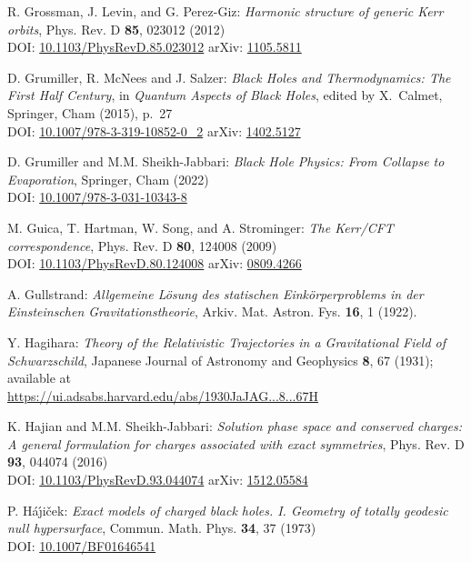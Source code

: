 \begin{thebibliography}{123}
R. Grossman, J. Levin, and G. Perez-Giz:
{\em Harmonic structure of generic Kerr orbits},
Phys. Rev. D {\bf 85}, 023012 (2012)\\
DOI: \href{https://doi.org/10.1103/PhysRevD.85.023012}{10.1103/PhysRevD.85.023012}\hfill
arXiv: \href{https://arxiv.org/abs/1105.5811}{1105.5811}

D. Grumiller, R. McNees and J. Salzer:
{\em Black Holes and Thermodynamics: The First Half Century},
in {\em Quantum Aspects of Black Holes}, edited by X.~Calmet,
Springer, Cham (2015), p.~27\\
DOI: \href{https://doi.org/10.1007/978-3-319-10852-0_2}{10.1007/978-3-319-10852-0\_2}\hfill
arXiv: \href{https://arxiv.org/abs/1402.5127}{1402.5127}

D. Grumiller and M.M. Sheikh-Jabbari:
{\em Black Hole Physics: From Collapse to Evaporation},
Springer, Cham (2022)\\
DOI: \href{https://doi.org/10.1007/978-3-031-10343-8}{10.1007/978-3-031-10343-8}

M. Guica, T. Hartman, W. Song, and A. Strominger:
{\em The Kerr/CFT correspondence},
Phys. Rev. D {\bf 80}, 124008 (2009)\\
DOI: \href{https://doi.org/10.1103/PhysRevD.80.124008}{10.1103/PhysRevD.80.124008}\hfill
arXiv: \href{https://arxiv.org/abs/0809.4266}{0809.4266}

A. Gullstrand:
\emph{Allgemeine Lösung des statischen Einkörperproblems in der Einsteinschen Gravitationstheorie},
Arkiv. Mat. Astron. Fys. {\bf 16}, 1 (1922).

Y. Hagihara:
\emph{Theory of the Relativistic Trajectories in a Gravitational Field of Schwarzschild},
Japanese Journal of Astronomy and Geophysics {\bf 8}, 67 (1931);
available at \\
\url{https://ui.adsabs.harvard.edu/abs/1930JaJAG...8...67H}

K. Hajian and M.M. Sheikh-Jabbari:
{\em Solution phase space and conserved charges: A general formulation for charges associated with exact symmetries},
Phys. Rev. D {\bf 93}, 044074 (2016)\\
DOI: \href{https://doi.org/10.1103/PhysRevD.93.044074}{10.1103/PhysRevD.93.044074}\hfill
arXiv: \href{https://arxiv.org/abs/1512.05584}{1512.05584}

P. H\'a\'\j i\v{c}ek:
{\em Exact models of charged black holes. I. Geometry
of totally geodesic null hypersurface},
Commun. Math. Phys. {\bf 34}, 37 (1973)\\
DOI: \href{https://doi.org/10.1007/BF01646541}{10.1007/BF01646541}


\end{thebibliography}
